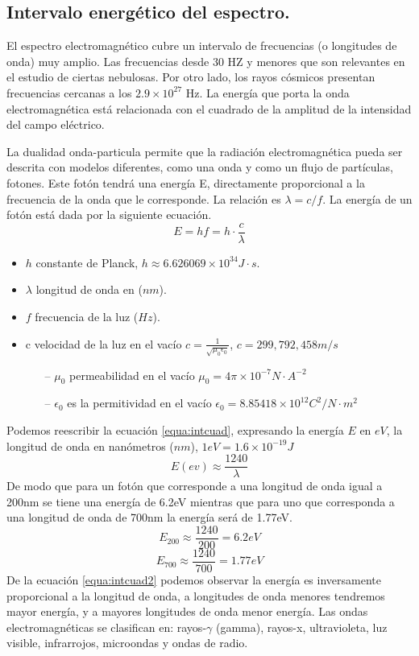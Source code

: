 \subsection{Intervalo energético del espectro.}
El espectro electromagnético cubre un intervalo de frecuencias (o longitudes de onda) muy amplio. Las frecuencias desde 30 HZ y menores que son relevantes en el estudio de ciertas nebulosas. Por otro lado, los rayos cósmicos presentan frecuencias cercanas a los  $2.9 \times 10^{27}$ Hz.
La energía que porta la onda electromagnética está relacionada con el cuadrado de la amplitud de la intensidad del campo eléctrico. 

La dualidad onda-particula permite que la radiación electromagnética pueda ser descrita con modelos diferentes, como una onda y como un flujo de partículas, fotones. Este fotón tendrá una energía E, directamente proporcional a la frecuencia de la onda que le corresponde. La relación es 
$\lambda = c/f$. La energía de un fotón está dada por la siguiente ecuación.
\begin{equation}
E = hf =h\cdot \frac{c}{\lambda}
\label{equa:intcuad}
\end{equation}
\begin{itemize}
	\item $h$ constante de Planck, $h \approx 6.626069\times 10^{34} J\cdot s$.
	\item $\lambda$ longitud de onda en ($nm$).
	\item $f$ frecuencia de la luz ($Hz$).
	\item c velocidad de la luz en el vacío $c = \frac{1}{\sqrt{\mu_0\epsilon_0}}$, $c = 299,792,458 m/s$
	\begin{itemize}
		\item[--] $\mu_0$ permeabilidad en el vacío $\mu_0 = 4\pi\times10^{-7} N\cdot A^{-2}$
		\item[--] $\epsilon_0$ es la permitividad en el vacío $\epsilon_0 = 8.85418\times10^{12} C^2/N\cdot m^2$
	\end{itemize}
	
	
	
\end{itemize}
Podemos reescribir la ecuación \ref{equa:intcuad}, expresando la energía $E$ en $eV$, la longitud de onda en nanómetros ($nm$), $1eV = 1.6\times 10^{-19} J$
\begin{equation}
E(ev)\approx \frac{1240}{\lambda}
\label{equa:intcuad2}
\end{equation}
De modo que para un fotón que corresponde a una longitud de onda igual a 200nm se tiene una energía de 6.2eV mientras que para uno que corresponda a una longitud de onda de 700nm la energía será de 1.77eV.
$$E_{200}\approx \frac{1240}{200}=6.2eV $$
$$E_{700}\approx \frac{1240}{700}=1.77eV $$
De la ecuación \ref{equa:intcuad2} podemos observar la energía es inversamente proporcional a la longitud de onda, a longitudes de onda menores tendremos mayor energía, y a mayores longitudes de onda menor energía.
Las ondas electromagnéticas se clasifican en: rayos-$\gamma$ (gamma), rayos-x, ultravioleta, luz visible, infrarrojos, microondas y ondas de radio.


